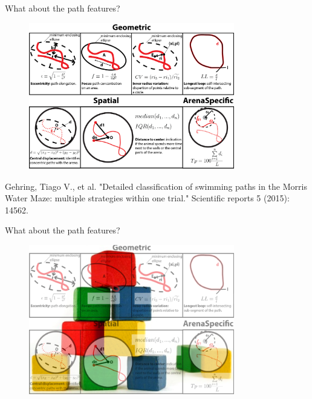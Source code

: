 \documentclass{beamer}
\begin{document}
{\begin{frame}{What about the path features?}
	\begin{multicols}{2}
	\begin{figure}[H]
		\centering
		\includegraphics[width=0.8\textwidth]{figures/features}
	\end{figure}
	\tiny{Gehring, Tiago V., et al. "Detailed classification of swimming paths in the Morris Water Maze: multiple strategies within one trial." Scientific reports 5 (2015): 14562.}	
	\end{multicols}	
\end{frame}

\begin{frame}{What about the path features?}
	\begin{figure}[H]
		\centering
		\includegraphics[width=0.8\textwidth]{figures/buildingblocks2}
	\end{figure}
\end{frame}

}
\end{document}
